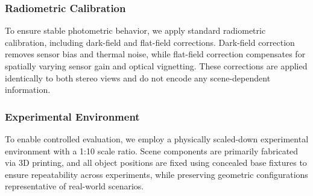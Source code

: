 \documentclass[letterpaper, 10 pt, conference]{ieeeconf}  %
\begin{document}
\subsubsection{\textbf{Radiometric Calibration}}
To ensure stable photometric behavior, we apply standard radiometric calibration, including dark-field and flat-field corrections.
Dark-field correction removes sensor bias and thermal noise, while flat-field correction compensates for spatially varying sensor gain and optical vignetting.
These corrections are applied identically to both stereo views and do not encode any scene-dependent information.

\subsubsection{\textbf{Experimental Environment}}
To enable controlled evaluation, we employ a physically scaled-down experimental environment with a 1:10 scale ratio.
Scene components are primarily fabricated via 3D printing, and all object positions are fixed using concealed base fixtures to ensure repeatability across experiments, while preserving geometric configurations representative of real-world scenarios.
\end{document}
